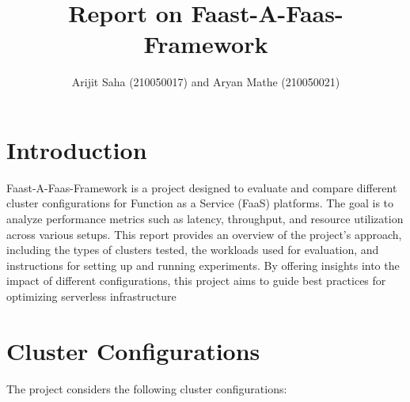 \documentclass{article}
\title{Report on Faast-A-Faas-Framework}
\author{Arijit Saha (210050017) and Aryan Mathe (210050021)}
\date{}
\begin{document}
\maketitle

\section{Introduction}
Faast-A-Faas-Framework is a project designed to evaluate and compare different
cluster configurations for Function as a Service (FaaS) platforms. The goal is
to analyze performance metrics such as latency, throughput, and resource
utilization across various setups. This report provides an overview of the
project's approach, including the types of clusters tested, the workloads used
for evaluation, and instructions for setting up and running experiments. By
offering insights into the impact of different configurations, this project
aims to guide best practices for optimizing serverless infrastructure

\section{Cluster Configurations}
The project considers the following cluster configurations:
\end{document}

